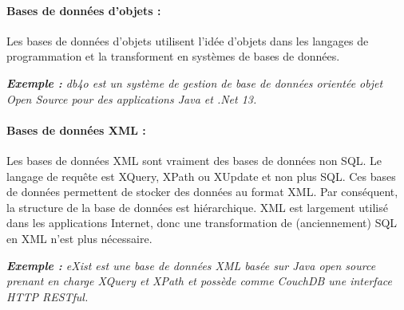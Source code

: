 \paragraph{Bases de données d'objets :} Les bases de données d'objets utilisent l'idée d'objets dans les langages de programmation et la transforment en systèmes de bases de données.

\textit{\textbf{Exemple :} db4o est un système de gestion de base de données orientée objet Open Source pour des applications Java et .Net 13.}

\paragraph{Bases de données XML :} Les bases de données XML sont vraiment des bases de données non SQL. Le langage de requête est XQuery, XPath ou XUpdate et non plus SQL. Ces bases de données permettent de stocker des données au format XML. Par conséquent, la structure de la base de données est hiérarchique. XML est largement utilisé dans les applications Internet, donc une transformation de (anciennement) SQL en XML n'est plus nécessaire.

\textit{\textbf{Exemple :} eXist est une base de données XML basée sur Java open source prenant en charge XQuery et XPath et possède comme CouchDB une interface HTTP RESTful.}


